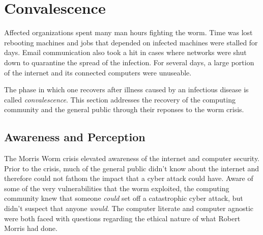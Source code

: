 \section*{Convalescence}

Affected organizations spent many man hours fighting the worm. Time was lost
rebooting machines and jobs that depended on infected machines were stalled for days.
Email communication also took a hit in cases where networks were shut down to
quarantine the spread of the infection\cite{seeley_tour_1989}. For several days,
a large portion of the internet and its connected computers were unuseable.

The phase in which one recovers after illness caused by an infectious disease is
called \textit{convalescence}. This section addresses the recovery of the
computing community and the general public through their reponses to the worm
crisis.

\subsection*{Awareness and Perception}
The Morris Worm crisis elevated awareness of the internet and
computer security. Prior to the crisis, much of the general public didn't 
know about the internet and therefore could not fathom the impact that a
cyber attack could have. Aware of some of the very
vulnerabilities that the worm exploited, the computing community knew that
someone \textit{could} set off a catastrophic cyber attack, but didn't
suspect that anyone \textit{would}. The computer literate and computer agnostic
were both faced with questions regarding the ethical nature of what Robert
Morris had done.

